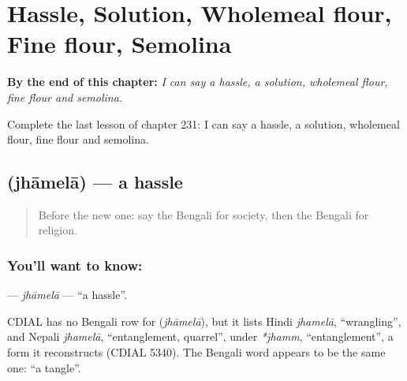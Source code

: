 
\chapter{Hassle, Solution, Wholemeal flour, Fine flour, Semolina}
\label{ch:bn-hassle-solution-wholemeal-flour-fine-flour-semolina}

\begin{chapteropening}
\textbf{By the end of this chapter:} \emph{I can say a hassle, a solution, wholemeal flour, fine flour and semolina.}

Complete the last lesson of chapter 231: I can say a hassle, a solution, wholemeal flour, fine flour and semolina.
\end{chapteropening}

\section[\texorpdfstring{\bn{ঝামেলা} (jhāmelā)}{ঝামেলা (jhāmelā)}]{ (jhāmelā) — a hassle}

\label{lesson:BN-C231-jhamela}



\begin{quote}
Before the new one: say the Bengali for society, then the Bengali for religion.
\end{quote}

\subsection*{You'll want to know: }
\textbf{} — \emph{jhāmelā} — \textquotedblleft{}a hassle\textquotedblright{}.

\begin{cousinweb}
CDIAL has no Bengali row for \textbf{} (\emph{jhāmelā}), but it lists Hindi \emph{jhamelā}, \textquotedblleft{}wrangling\textquotedblright{}, and Nepali \emph{jhamelā}, \textquotedblleft{}entanglement, quarrel\textquotedblright{}, under \emph{*jhamm}, \textquotedblleft{}entanglement\textquotedblright{}, a form it reconstructs (CDIAL 5340). The Bengali word appears to be the same one: \textquotedblleft{}a tangle\textquotedblright{}.
\end{cousinweb}

